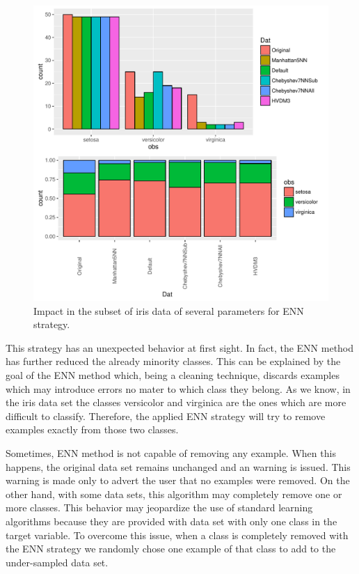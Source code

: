 \documentclass[10pt,a4paper]{article}\usepackage[]{graphicx}\usepackage[]{color}
\makeatletter
\def\maxwidth{ %
  \ifdim\Gin@nat@width>\linewidth
    \linewidth
  \else
    \Gin@nat@width
  \fi
}
\newenvironment{knitrout}{}{} %
\makeatother
\begin{document}
\begin{knitrout}\footnotesize
{}\color{fgcolor}\begin{figure}

{\centering \includegraphics[width=\maxwidth,height=0.5\textheight]{figures/UBL-ir_ENN_plot-1} 

}

\caption[Impact in the subset of iris data of several parameters for ENN strategy]{Impact in the subset of iris data of several parameters for ENN strategy.}\label{fig:ir_ENN_plot}
\end{figure}


\end{knitrout}


This strategy has an unexpected behavior at first sight. In fact, the ENN method has further reduced the already minority classes. This can be explained by the goal of the ENN method which, being a cleaning technique, discards examples which may introduce errors no mater to which class they belong. As we know, in the iris data set the classes versicolor and virginica are the ones which are more difficult to classify. Therefore, the applied ENN strategy will try to remove examples exactly from those two classes.


Sometimes, ENN method is not capable of removing any example. When this happens, the original data set remains unchanged and an warning is issued. This warning is made only to advert the user that no examples were removed. On the other hand, with some data sets, this algorithm may completely remove one or more classes. This behavior may jeopardize the use of standard learning algorithms because they are provided with data set with only one class in the target variable. To overcome this issue, when a class is completely removed with the ENN strategy we randomly chose one example of that class to add to the under-sampled data set.
\end{document}

